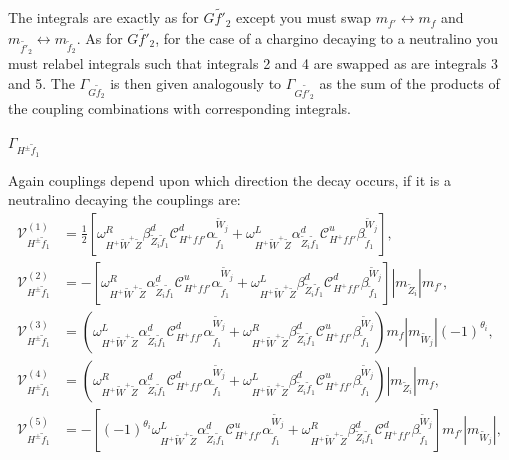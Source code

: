 \documentclass[final,3p,times]{elsarticle}
\begin{document}
The integrals are exactly as for $G \tilde{f'}_2$ except you must swap $m_{f'} \leftrightarrow m_{f}$ and $m_{\tilde{f'}_2} \leftrightarrow m_{\tilde{f}_2}$. As for $G \tilde{f'}_2$, for the case of a chargino decaying to a neutralino you must relabel integrals such that integrals 2 and 4 are swapped as are integrals 3 and 5.
The $\Gamma_{G \tilde{f}_2}$ is then given analogously to $\Gamma_{G \tilde{f'}_2}$ as the sum of the products of the coupling combinations with corresponding integrals.

\textbf{\underline{$\Gamma_{H^{\pm} \tilde{f}_1}$}}

Again couplings depend upon which direction the decay occurs, if it is a neutralino decaying the couplings are:
\begin{align}
\mathcal{V}_{H^{\pm} \tilde{f}_1}^{(1)} &= \frac{1}{2}[\omega_{H^+ \tilde{W}^+ \tilde{Z}}^R \beta_{\tilde{Z}_i \tilde{f}_1}^{d} \mathcal{C}_{H^+ f f'}^d \alpha_{\tilde{f}_1}^{\tilde{W}_j} + \omega_{H^+ \tilde{W}^+ \tilde{Z}}^L \alpha_{\tilde{Z}_i \tilde{f}_1}^{d} \mathcal{C}_{H^+ f f'}^u \beta_{\tilde{f}_1}^{\tilde{W}_j}], \\
\mathcal{V}_{H^{\pm} \tilde{f}_1}^{(2)} &= -[\omega_{H^+ \tilde{W}^+ \tilde{Z}}^R \alpha_{\tilde{Z}_i \tilde{f}_1}^{d} \mathcal{C}_{H^+ f f'}^u \alpha_{\tilde{f}_1}^{\tilde{W}_j} + \omega_{H^+ \tilde{W}^+ \tilde{Z}}^L \beta_{\tilde{Z}_i \tilde{f}_1}^{d} \mathcal{C}_{H^+ f f'}^d \beta_{\tilde{f}_1}^{\tilde{W}_j}]|m_{\tilde{Z}_i}|m_{f'}, \\
\mathcal{V}_{H^{\pm} \tilde{f}_1}^{(3)} &= (\omega_{H^+ \tilde{W}^+ \tilde{Z}}^L \alpha_{\tilde{Z}_i \tilde{f}_1}^{d}  \mathcal{C}_{H^+ f f'}^d \alpha_{\tilde{f}_1}^{\tilde{W}_j} + \omega_{H^+ \tilde{W}^+ \tilde{Z}}^R \beta_{\tilde{Z}_i \tilde{f}_1}^{d} \mathcal{C}_{H^+ f f'}^u \beta_{\tilde{f}_1}^{\tilde{W}_j})m_{f}|m_{\tilde{W}_j}|(-1)^{\theta_i}, \\
\mathcal{V}_{H^{\pm} \tilde{f}_1}^{(4)} &= (\omega_{H^+ \tilde{W}^+ \tilde{Z}}^R \alpha_{\tilde{Z}_i \tilde{f}_1}^{d} \mathcal{C}_{H^+ f f'}^d \alpha_{\tilde{f}_1}^{\tilde{W}_j} + \omega_{H^+ \tilde{W}^+ \tilde{Z}}^L \beta_{\tilde{Z}_i \tilde{f}_1}^{d} \mathcal{C}_{H^+ f f'}^u \beta_{\tilde{f}_1}^{\tilde{W}_j})|m_{\tilde{Z}_i}|m_{f}, \\
\mathcal{V}_{H^{\pm} \tilde{f}_1}^{(5)} &= -[(-1)^{\theta_i}\omega_{H^+ \tilde{W}^+ \tilde{Z}}^L \alpha_{\tilde{Z}_i \tilde{f}_1}^{d} \mathcal{C}_{H^+ f f'}^u \alpha_{\tilde{f}_1}^{\tilde{W}_j} + \omega_{H^+ \tilde{W}^+ \tilde{Z}}^R \beta_{\tilde{Z}_i \tilde{f}_1}^{d} \mathcal{C}_{H^+ f f'}^d \beta_{\tilde{f}_1}^{\tilde{W}_j}]m_{f'}|m_{\tilde{W}_j}|, \\

\end{align}
\end{document}
